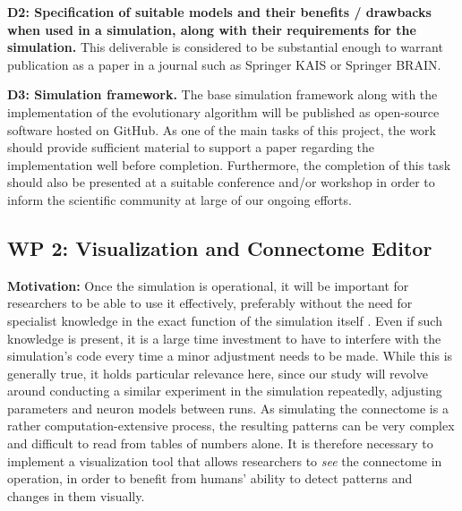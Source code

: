 \documentclass[a4paper,11pt]{article}
\begin{document}


\textbf{D2: Specification of suitable models and their benefits / drawbacks when used in a simulation, along with their requirements for the simulation.} This deliverable is considered to be substantial enough to warrant publication as a paper in a journal such as Springer KAIS or Springer BRAIN.


\textbf{D3: Simulation framework.} The base simulation framework along with the implementation of the evolutionary algorithm will be published as open-source software hosted on GitHub. As one of the main tasks of this project, the work should provide sufficient material to support a paper regarding the implementation well before completion. Furthermore, the completion of this task should also be presented at a suitable conference and/or workshop in order to inform the scientific community at large of our ongoing efforts.
\\[0,2cm]



\subsection{WP 2: Visualization and Connectome Editor}

\textbf{Motivation:}
Once the simulation is operational, it will be important for researchers to be able to use it effectively, preferably without the need for specialist knowledge in the exact function of the simulation itself \citep{Zudilova-Seinstra2007}. Even if such knowledge is present, it is a large time investment to have to interfere with the simulation's code every time a minor adjustment needs to be made. While this is generally true, it holds particular relevance here, since our study will revolve around conducting a similar experiment in the simulation repeatedly, adjusting parameters and neuron models between runs. As simulating the connectome is a rather computation-extensive process, the resulting patterns can be very complex and difficult to read from tables of numbers alone. It is therefore necessary to implement a visualization tool that allows researchers to \emph{see} the connectome in operation, in order to benefit from humans' ability to detect patterns and changes in them visually.
\end{document}
